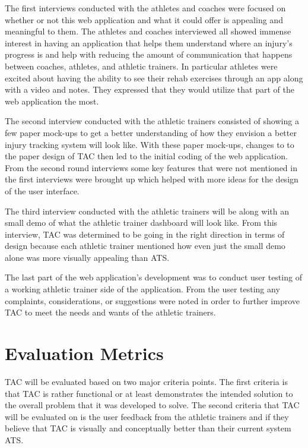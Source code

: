 \documentclass[10pt,twocolumn]{article}
\begin{document}
The first interviews conducted with the athletes and coaches were focused on whether or not this web application and what it could offer is appealing and meaningful to them. The athletes and coaches interviewed all showed immense interest in having an application that helps them understand where an injury's progress is and help with reducing the amount of communication that happens between coaches, athletes, and athletic trainers. In particular athletes were excited about having the ability to see their rehab exercises through an app along with a video and notes. They expressed that they would utilize that part of the web application the most.

The second interview conducted with the athletic trainers consisted of showing a few paper mock-ups to get a better understanding of how they envision a better injury tracking system will look like. With these paper mock-ups, changes to to the paper design of TAC then led to the initial coding of the web application. From the second round interviews some key features that were not mentioned in the first interviews were brought up which helped with more ideas for the design of the user interface.

The third interview conducted with the athletic trainers will be along with an small demo of what the athletic trainer dashboard will look like. From this interview, TAC was determined to be going in the right direction in terms of design because each athletic trainer mentioned how even just the small demo alone was more visually appealing than ATS.

The last part of the web application's development was to conduct user testing of a working athletic trainer side of the application. From the user testing any complaints, considerations, or suggestions were noted in order to further improve TAC to meet the needs and wants of the athletic trainers.

\section{Evaluation Metrics}
TAC will be evaluated based on two major criteria points. The first criteria is that TAC is rather functional or at least demonstrates the intended solution to the overall problem that it was developed to solve. The second criteria that TAC will be evaluated on is the user feedback from the athletic trainers and if they believe that TAC is visually and conceptually better than their current system ATS.
\end{document}
